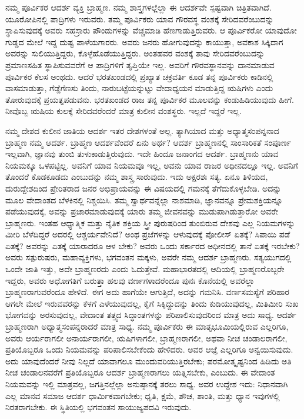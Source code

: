 ನಮ್ಮ ಪೂರ್ವಿಕರ ಆದರ್ಶ ವ್ಯಕ್ತಿ ಬ್ರಾಹ್ಮಣ. ನಮ್ಮ ಶಾಸ್ತ್ರಗಳಲ್ಲೆಲ್ಲಾ ಈ ಆದರ್ಶವೇ ಸ್ಪಷ್ಟವಾಗಿ ಚಿತ್ರಿತವಾಗಿದೆ. ಯೂರೋಪಿನಲ್ಲಿ ಪಾದ್ರಿಗಳು ಇರುವರು. ತಮ್ಮ ಪೂರ್ವಿಕರು ಯಾವ ಗೌರವಸ್ಥ ವಂಶಕ್ಕೆ ಸೇರಿದವರೆಂಬುದನ್ನು ಸ್ಥಾಪಿಸುವುದಕ್ಕೆ ಅವರು ಸಹಸ್ರಾರು ಪೌಂಡುಗಳನ್ನು ವೆಚ್ಚಮಾಡಿ ಹೆಣಗಾಡುತ್ತಿರುವರು. ಆ ಪೂರ್ವಿಕರೋ ಯಾವುದೋ ಗುಡ್ಡದ ಮೇಲೆ ಇದ್ದ ದುಷ್ಟ ಪಾಳೆಯಗಾರರು. ಅವರು ಜನರು ಹೋಗುವುದನ್ನು ಕಾಯುತ್ತಾ, ಅವಕಾಶ ಸಿಕ್ಕಿದಾಗ ಅವರನ್ನು ಸುಲಿಯುತ್ತಿದ್ದರು, ಕೊಳ್ಳೆಹೊಡೆಯುತ್ತಿದ್ದರು. ಅಂತಹವರ ವಂಶಕ್ಕೆ ತಾವು ಸೇರಿದವರೆಂಬುದನ್ನು ಪ್ರಮಾಣಸಹಿತ ಸ್ಥಾಪಿಸುವವರೆಗೆ ಆ ಪಾದ್ರಿಗಳಿಗೆ ತೃಪ್ತಿಯೇ ಇಲ್ಲ. ಅವರಿಗೆ ಗೌರವಸ್ಥಾನವನ್ನು ದಾನಮಾಡುವ ಪೂರ್ವಿಕರ ಕೆಲಸ ಅಂಥದು. ಆದರೆ ಭರತಖಂಡದಲ್ಲಿ ಪ್ರಖ್ಯಾತ ಚಕ್ರವರ್ತಿ ಕೂಡ ತನ್ನ ಪೂರ್ವಿಕರು ಕಾಡಿನಲ್ಲಿ ವಾಸಮಾಡುತ್ತಾ, ಗೆಡ್ಡೆಗೆಣಸು ತಿಂದು, ನಾರುಬಟ್ಟೆಯನ್ನುಟ್ಟು ವೇದಾಧ್ಯಯನ ಮಾಡುತ್ತಿದ್ದ ಋಷಿಗಳು ಎಂದು ತೋರುವುದಕ್ಕೆ ಪ್ರಯತ್ನಪಡುವನು. ಭರತಖಂಡದ ರಾಜ ತನ್ನ ಪೂರ್ವಿಕರ ಮೂಲವನ್ನು ಕಂಡುಹಿಡಿಯುವುದು ಹೀಗೆ. ನೀವೊಬ್ಬ ಋಷಿಯ ಕುಲಕ್ಕೆ ಸೇರಿದವರೆಂದರೆ ಮಾತ್ರ ಕುಲೀನ ವಂಶಸ್ಥರು. ಇಲ್ಲದೆ ಇದ್ದರೆ ಇಲ್ಲ.

\vskip 0.2cm

ನಮ್ಮ ದೇಶದ ಕುಲೀನ ಜಾತಿಯ ಆದರ್ಶ ಇತರ ದೇಶಗಳಂತೆ ಅಲ್ಲ. ತ್ಯಾಗಿಯಾದ ಮತ್ತು ಅಧ್ಯಾತ್ಮಸಂಪನ್ನನಾದ ಬ್ರಾಹ್ಮಣ ನಮ್ಮ ಆದರ್ಶ. ಬ್ರಾಹ್ಮಣ ಆದರ್ಶವೆಂದರೆ ಏನು ಅರ್ಥ? ಆದರ್ಶ ಬ್ರಾಹ್ಮಣನಲ್ಲಿ ಸಾಂಸಾರಿಕತೆ ಸಂಪೂರ್ಣ ಇಲ್ಲವಾಗಿ, ಜ್ಞಾನವು ತುಂಬಿ ತುಳುಕಾಡುತ್ತಿರುವುದು. ಇದೇ ಹಿಂದೂ ಜನಾಂಗದ ಆದರ್ಶ. ಬ್ರಾಹ್ಮಣನು ಯಾವ ನಿಯಮಕ್ಕೂ ಒಳಪಟ್ಟಿಲ್ಲ. ಅವನಿಗೆ ಯಾವ ನಿಯಮವೂ ಇಲ್ಲ, ಅವನು ಯಾವ ರಾಜರ ಅಧೀನದಲ್ಲೂ ಇಲ್ಲ. ಅವನಿಗೆ ತೊಂದರೆ ಕೊಡಕೂಡದು ಎಂಬುದನ್ನು ನಮ್ಮ ಶಾಸ್ತ್ರ ಸಾರುವುದು. ಇದು ಅಕ್ಷರಶಃ ಸತ್ಯ. ಏನೂ ತಿಳಿಯದ, ದುರುದ್ದೇಶದಿಂದ ಪ್ರೇರಿತರಾದ ಜನರ ಅಭಿಪ್ರಾಯವನ್ನು ಈ ವಿಷಯದಲ್ಲಿ ಗಮನಕ್ಕೆ ತೆಗೆದುಕೊಳ್ಳಬೇಡಿ. ಅದನ್ನು ಮೂಲ ವೇದಾಂತದ ಬೆಳಕಿನಲ್ಲಿ ನಿಶ್ಚಯಿಸಿ. ತಮ್ಮ ಸ್ವಾರ್ಥವನ್ನೆಲ್ಲಾ ನಾಶಮಾಡಿ, ಜ್ಞಾನವನ್ನೂ ಪ್ರೇಮಶಕ್ತಿಯನ್ನೂ ಪಡೆಯುವುದಕ್ಕೆ, ಅವನ್ನು ಪ್ರಚಾರಮಾಡುವುದಕ್ಕೆ ಯಾರು ತಮ್ಮ ಜೀವನವನ್ನು ಮುಡುಪಾಗಿಡುತ್ತಾರೋ ಅವರೇ ಬ್ರಾಹ್ಮಣರು. ಇಂತಹ ಆಧ್ಯಾತ್ಮಿಕ ಮತ್ತು ನೈತಿಕ ಶಕ್ತಿಯ ಸ್ತ್ರೀ ಪುರುಷರಿಂದ ತುಂಬಿರುವ ದೇಶವು ಎಲ್ಲ ನಿಯಮಗಳನ್ನು ಮೀರಿ ಬೆಳೆದಿದ್ದರೆ ಅದರಲ್ಲಿ ಆಶ್ಚರ್ಯವೇನಿದೆ? ಅಂಥ ಪ್ರಜೆಗಳನ್ನು ಆಳುವುದಕ್ಕೆ ಪೋಲೀಸ್​ ಏತಕ್ಕೆ? ಸಿಪಾಯಿ ಪಡೆ ಏತಕ್ಕೆ? ಅವರನ್ನು ಏತಕ್ಕೆ ಯಾರಾದರೂ ಆಳ ಬೇಕು? ಅವರು ಒಂದು ಸರ್ಕಾರದ ಅಧೀನದಲ್ಲಿ ತಾನೆ ಏತಕ್ಕೆ ಇರಬೇಕು? ಅವರು ಸತ್ಪುರುಷರು, ಮಹಾವ್ಯಕ್ತಿಗಳು, ಭಗವಂತನ ಮಕ್ಕಳು, ಅವರೇ ನಮ್ಮ ಆದರ್ಶ ಬ್ರಾಹ್ಮಣರು. ಸತ್ಯಯುಗದಲ್ಲಿ ಒಂದೇ ಜಾತಿ ಇತ್ತು, ಅದೇ ಬ್ರಾಹ್ಮಣರದು ಎಂದು ಓದುತ್ತೇವೆ. ಮಹಾಭಾರತದಲ್ಲಿ ಆದಿಯಲ್ಲಿ ಬ್ರಾಹ್ಮಣರೊಬ್ಬರೇ ಇದ್ದರು, ಅವರು ಅಧೋಗತಿಗೆ ಬರುತ್ತಾ ಹಲವು ವರ್ಣಗಳಾದರೆಂದೂ ಪುನಃ ಕೊನೆಯಲ್ಲಿ ಅವರೆಲ್ಲಾ ಬ್ರಾಹ್ಮಣರಾಗುವರೆಂದೂ ಹೇಳಿದೆ. ಈಗ ಅದು ಹಾಗೆಯೇ ಆಗುತ್ತಿದೆ, ಅದನ್ನು ಗಮನಿಸಿ. ವರ್ಣಸಮಸ್ಯೆಗೆ ಪರಿಹಾರ ಆಗಲೇ ಮೇಲೆ ಇರುವವರನ್ನು ಕೆಳಗೆ ಎಳೆಯುವುದಲ್ಲ, ಕೈಗೆ ಸಿಕ್ಕಿದ್ದುದನ್ನು ತಿಂದು ಕುಡಿಯುವುದಲ್ಲ, ಮಿತಿಮೀರಿ ಸುಖ ಭೋಗವನ್ನು ಅರಸುವುದಲ್ಲ, ವೇದಾಂತ ತತ್ತ್ವದ ಸಿದ್ಧಾಂತಗಳನ್ನು ಪರಿಪಾಲಿಸುವುದರಿಂದ ಮಾತ್ರ ಅದು ಸಾಧ್ಯ. ಆದರ್ಶ ಬ್ರಾಹ್ಮಣರಾಗಿ ಅಧ್ಯಾತ್ಮ\break ಸಂಪನ್ನರಾದರೆ ಮಾತ್ರ ಸಾಧ್ಯ. ನಮ್ಮ ಪೂರ್ವಿಕರು ಈ ಮಾತೃಭೂಮಿಯಲ್ಲಿರುವ ಎಲ್ಲರಿಗೂ, ಅವರು ಆರ್ಯರಾಗಲೀ ಅನಾರ್ಯರಾಗಲೀ, ಋಷಿಗಳಾಗಲೀ, ಬ್ರಾಹ್ಮಣರಾಗಲೀ, ಅಥವಾ ನೀಚ ಚಂಡಾಲರಾಗಲೀ, ಪ್ರತಿಯೊಬ್ಬರೂ ಒಂದು ನಿಯಮವನ್ನು ಪರಿಪಾಲಿಸಬೇಕೆಂದು ಹೇಳಿದರು. ಅವರ ಆಜ್ಞೆ ಎಲ್ಲರಿಗೂ ಅನ್ವಯಿಸುವುದು. ಅದು ಯಾವುದೆಂದರೆ ನೀವು ನಿಲ್ಲದೆ ಯಾವಾಗಲೂ ಮುಂದುವರಿಯುತ್ತಿರಬೇಕು; ಪರಮೋತ್ಕೃಷ್ಟನಿಂದ ಹಿಡಿದು ಅತಿ ನೀಚ ಚಂಡಾಲನವರೆಗೆ ಪ್ರತಿಯೊಬ್ಬರೂ ಆದರ್ಶ ಬ್ರಾಹ್ಮಣರಾಗಲು ಯತ್ನಿಸಬೇಕು, ಎಂಬುದು. ಈ ವೇದಾಂತ ನಿಯಮವನ್ನು ಇಲ್ಲಿ ಮಾತ್ರವಲ್ಲ, ಜಗತ್ತಿನಲ್ಲೆಲ್ಲಾ ಅನುಷ್ಠಾನಕ್ಕೆ ತರಲು ಸಾಧ್ಯ. ಅವರ ಉದ್ದೇಶ ಇದು: ನಿಧಾನವಾಗಿ ಎಲ್ಲ ಮಾನವ ಸಮಾಜ ಆದರ್ಶ ಧಾರ್ಮಿಕವಾಗಬೇಕು; ಧೃತಿ, ಕ್ಷಮೆ, ಶೌಚ, ಶಾಂತಿ, ಮತ್ತು ಧ್ಯಾನ ಇವುಗಳಲ್ಲಿ ನಿರತರಾಗಬೇಕು. ಈ ಸ್ಥಿತಿಯಲ್ಲಿ ಭಗವಂತನ ಸಾಯುಜ್ಯಪದವಿ ಇರುವುದು.

